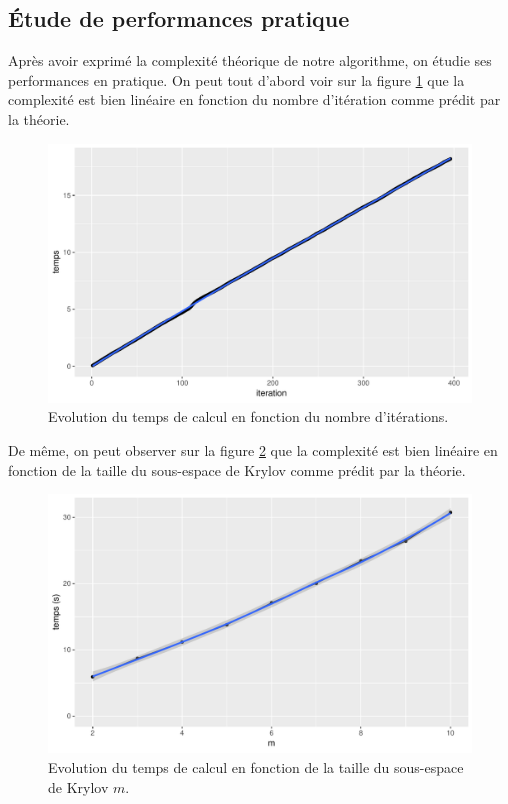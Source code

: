 \documentclass[11pt,a4paper]{article}
\begin{document}
	\subsection{Étude de performances pratique}
		Après avoir exprimé la complexité théorique de notre algorithme, on étudie ses performances en pratique. On peut tout d'abord voir sur la figure \ref{fig:tvsiter} que la complexité est bien linéaire en fonction du nombre d'itération comme prédit par la théorie.
		\begin{figure}
			\centering
			\includegraphics[width = 0.7\linewidth]{plots/tvsiter.pdf}
			\caption{Evolution du temps de calcul en fonction du nombre d'itérations. \label{fig:tvsiter}}
		\end{figure}

		De même, on peut observer sur la figure \ref{fig:tvsm} que la complexité est bien linéaire en fonction de la taille du sous-espace de Krylov comme prédit par la théorie.
		\begin{figure}
			\centering
			\includegraphics[width = 0.7\linewidth]{plots/tvsm.pdf}
			\caption{Evolution du temps de calcul en fonction de la taille du sous-espace de Krylov $m$. \label{fig:tvsm}}
		\end{figure}
\end{document}
